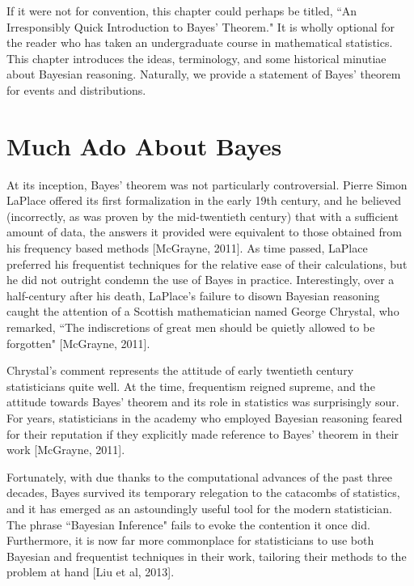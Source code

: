 \documentclass[12pt,twoside]{reedthesis}
\begin{document}
	If it were not for convention, this chapter could perhaps be titled, ``An Irresponsibly Quick Introduction to Bayes' Theorem." It is wholly optional for the reader who has taken an undergraduate course in mathematical statistics. This chapter introduces the ideas, terminology, and some historical minutiae about Bayesian reasoning. Naturally, we provide a statement of Bayes' theorem for events and distributions.
	\section{Much Ado About Bayes}
	At its inception, Bayes' theorem was not particularly controversial. Pierre Simon LaPlace offered its first formalization in the early 19th century, and he believed (incorrectly, as was proven by the mid-twentieth century) that with a sufficient amount of data, the answers it provided were equivalent to those obtained from his frequency based methods [McGrayne, 2011]. 
	As time passed, LaPlace preferred his frequentist techniques for the relative ease of their calculations, but he did not outright condemn the use of Bayes in practice. Interestingly, over a half-century after his death, LaPlace's failure to disown Bayesian reasoning caught the attention of a Scottish mathematician named George Chrystal, who remarked, ``The indiscretions of great men should be quietly allowed to be forgotten" [McGrayne, 2011].
	
	Chrystal's comment represents the attitude of early twentieth century statisticians quite well. At the time, frequentism reigned supreme, and the attitude towards Bayes' theorem and its role in statistics was surprisingly sour. For years, statisticians in the academy who employed Bayesian reasoning feared for their reputation if they explicitly made reference to Bayes' theorem in their work [McGrayne, 2011]. 
	
	Fortunately, with due thanks to the computational advances of the past three decades, Bayes survived its temporary relegation to the catacombs of statistics, and it has emerged as an astoundingly useful tool for the modern statistician. The phrase ``Bayesian Inference" fails to evoke the contention it once did. Furthermore, it is now far more commonplace for statisticians to use both Bayesian and frequentist techniques in their work, tailoring their methods to the problem at hand [Liu et al, 2013].
	
\end{document}
